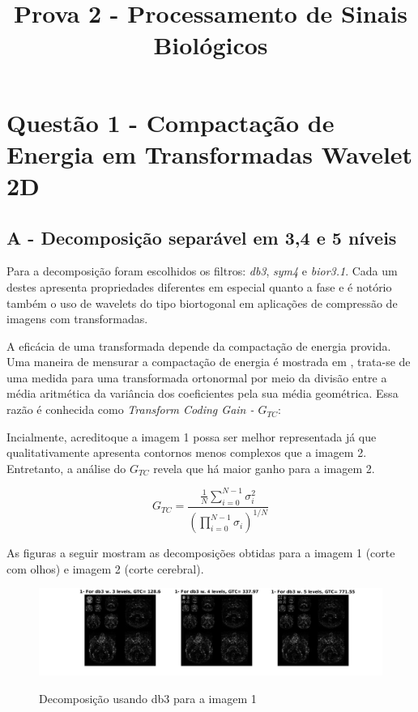 \documentclass{article}
\title{Prova 2 - Processamento de Sinais Biológicos}
\begin{document}
\onecolumn
\maketitle

\section{Questão 1 - Compactação de Energia em Transformadas Wavelet 2D}
\subsection*{A - Decomposição separável em 3,4 e 5 níveis}
Para a decomposição foram escolhidos os filtros: \textit{db3}, \textit{sym4} e \textit{bior3.1}. Cada um destes apresenta propriedades diferentes em especial quanto a fase e é notório também o uso de wavelets do tipo biortogonal em aplicações de compressão de imagens com transformadas.

A eficácia de uma transformada depende da compactação de energia provida. Uma maneira de mensurar a compactação de energia é mostrada em \cite{jayant}, trata-se de uma medida para uma transformada ortonormal por meio da divisão entre a média aritmética da variância dos coeficientes pela sua média geométrica. Essa razão é conhecida como \textit{Transform Coding Gain - $G_{TC}$}:

Incialmente, acreditoque a imagem 1 possa ser melhor representada já que qualitativamente apresenta contornos menos complexos que a imagem 2. Entretanto, a análise do $G_{TC}$ revela que há maior ganho para a imagem 2.

\begin{equation}
	G_{TC} = \frac{\frac{1}{N}\sum_{i=0}^{N-1} \sigma_i^2}{(\prod_{i=0}^{N-1}\sigma_i)^{1/N}}
\end{equation}

As figuras a seguir mostram as decomposições obtidas para a imagem 1 (corte com olhos) e imagem 2 (corte cerebral).
\begin{figure}[H]
	\begin{center}
		\label{fig:1_db3}
		\includegraphics[scale=0.55]{../1_db3.png}
		\caption{Decomposição usando db3 para a imagem 1}
	\end{center}
\end{figure}  
\end{document}
